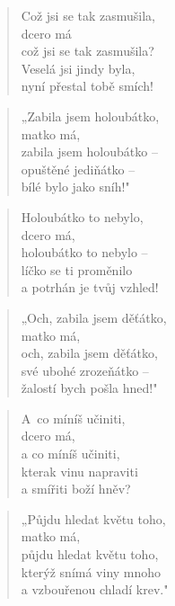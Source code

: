 
\begin{verse}
Což jsi se tak zasmušila, \\
dcero má \\
což jsi se tak zasmušila? \\
Veselá jsi jindy byla, \\
nyní přestal tobě smích!
\end{verse}

\begin{verse}
„Zabila jsem holoubátko, \\
matko má, \\
zabila jsem holoubátko -- \\
opuštěné jediňátko -- \\
bílé bylo jako sníh!"
\end{verse}

\begin{verse}
Holoubátko to nebylo, \\
dcero má, \\
holoubátko to nebylo -- \\
líčko se ti proměnilo \\
a potrhán je tvůj vzhled!
\end{verse}

\begin{verse}
„Och, zabila jsem děťátko, \\
matko má, \\
och, zabila jsem děťátko, \\
své ubohé zrozeňátko -- \\
žalostí bych pošla hned!"
\end{verse}

\begin{verse}
A~co míníš učiniti, \\
dcero má, \\
a co míníš učiniti, \\
kterak vinu napraviti \\
a smířiti boží hněv?
\end{verse}

\begin{verse}
„Půjdu hledat květu toho, \\
matko má, \\
půjdu hledat květu toho, \\
kterýž snímá viny mnoho \\
a vzbouřenou chladí krev."
\end{verse}

